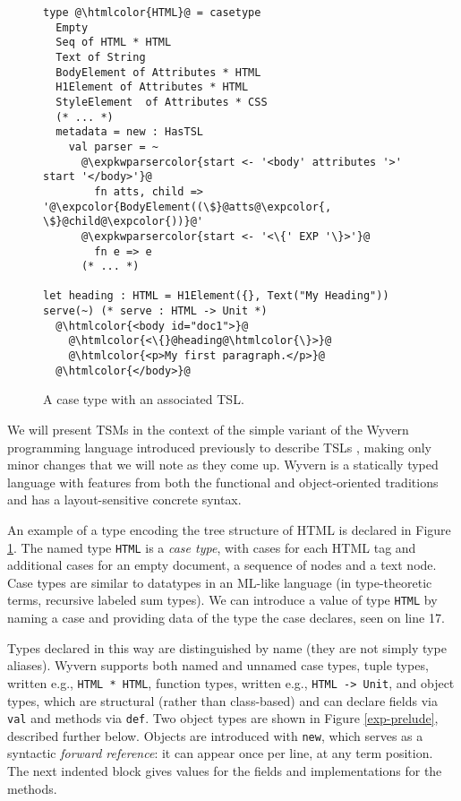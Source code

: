 \documentclass{sig-alternate}
\newcommand{\htmlcolor}[1]{\textcolor[HTML]{339933}{#1}}
\newcommand{\expkwparsercolor}[1]{\textcolor[HTML]{336699}{#1}}
\newcommand{\expcolor}[1]{\textcolor[HTML]{FF0033}{#1}}
\newcommand{\mycaption}[1]{\vspace{-4px}\caption{#1}\vspace{-2px}}
\begin{document}
\begin{figure}[t!]
\begin{lstlisting}[style=wyvern]
type @\htmlcolor{HTML}@ = casetype 
  Empty
  Seq of HTML * HTML 
  Text of String
  BodyElement of Attributes * HTML
  H1Element of Attributes * HTML
  StyleElement  of Attributes * CSS
  (* ... *)
  metadata = new : HasTSL
    val parser = ~
      @\expkwparsercolor{start <- '<body' attributes '>' start '</body>'}@
        fn atts, child => '@\expcolor{BodyElement((\$}@atts@\expcolor{, \$}@child@\expcolor{))}@'
      @\expkwparsercolor{start <- '<\{' EXP '\}>'}@
        fn e => e
      (* ... *)

let heading : HTML = H1Element({}, Text("My Heading"))
serve(~) (* serve : HTML -> Unit *)
  @\htmlcolor{<body id="doc1">}@
    @\htmlcolor{<\{}@heading@\htmlcolor{\}>}@
    @\htmlcolor{<p>My first paragraph.</p>}@
  @\htmlcolor{</body>}@
\end{lstlisting}
\mycaption{A case type with an associated TSL.}
\label{f-htmltype}
\end{figure}
We will present TSMs in the context of the simple variant of the Wyvern programming language introduced previously to describe TSLs  \cite{TSLs}, making only minor changes that we will note as they come up. Wyvern is a statically typed  language with features from both the functional and object-oriented traditions and has a layout-sensitive concrete syntax. 

An example of a type encoding the tree structure of HTML is declared in Figure \ref{f-htmltype}. The named type \verb|HTML| is a \emph{case type}, with cases for each HTML tag and additional cases for an empty document, a sequence of nodes and a text node. Case types are similar to datatypes in an ML-like language (in type-theoretic terms, recursive labeled sum types). 
We can introduce a value of type \verb|HTML| by naming a case and providing data of the type the case declares, seen on line 17.

Types declared in this way are distinguished by name (they are not simply type aliases). Wyvern supports both named and unnamed case types, tuple types, written e.g., \verb|HTML * HTML|, function types, written e.g., \verb|HTML -> Unit|, and object types, which are structural (rather than class-based) and can declare fields via \texttt{val} and methods via \texttt{def}. Two object types are shown in Figure \ref{exp-prelude}, described further below. Objects are introduced with \verb|new|, which  serves as a syntactic \emph{forward reference}: it can appear once per line, at any term position. The next indented block gives values for the fields and implementations for   the methods. %
\end{document}
